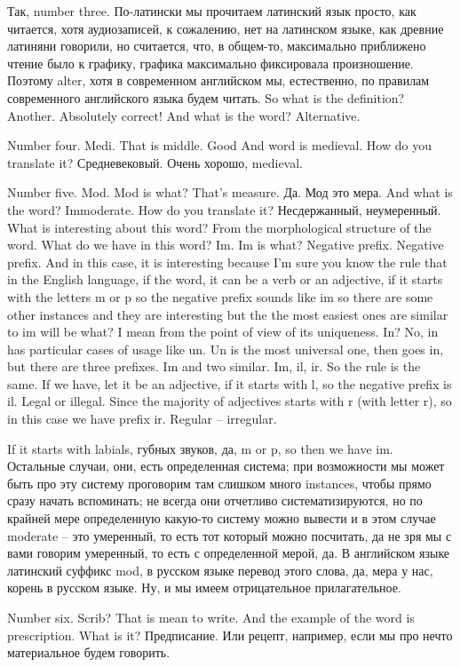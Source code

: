 \documentclass[main.tex]{subfiles}
\begin{document}
Так, number three.
По-латински мы прочитаем латинский язык просто, как читается, хотя аудиозаписей, к сожалению, нет на латинском языке, как древние латиняни говорили, но считается, что, в общем-то, максимально приближено чтение было к графику, графика максимально фиксировала произношение.
Поэтому alter, хотя в современном английском мы, естественно, по правилам современного английского языка будем читать.
So what is the definition? Another. Absolutely correct!
And what is the word? Alternative.

Number four.
Medi. That is middle. Good
And word is medieval.
How do you translate it? Средневековый.
Очень хорошо, medieval.

Number five.
Mod.
Mod is what?
That's measure.
Да.
Мод это мера.
And what is the word? Immoderate.
How do you translate it? Несдержанный, неумеренный.
What is interesting about this word?
From the morphological structure of the word.
What do we have in this word? Im.
Im is what? Negative prefix.
Negative prefix.
And in this case, it is interesting because I'm sure you know the rule that in the English language, if the word, it can be a verb or an adjective, if it starts with the letters m or p so the negative prefix sounds like im so there are some other instances and they are interesting but the the most easiest ones are similar to im will be what? I mean from the point of view of its uniqueness.
In? No, in has particular cases of usage like un.
Un is the most universal one, then goes in, but there are three prefixes.
Im and two similar.
Im, il, ir.
So the rule is the same.
If we have, let it be an adjective, if it starts with l, so the negative prefix is il.
Legal or illegal.
Since the majority of adjectives starts with r (with letter r), so in this case we have prefix ir.
Regular -- irregular.

If it starts with labials, губных звуков, да, m or p, so then we have im.
Остальные случаи, они, есть определенная система; при возможности мы может быть про эту систему проговорим там слишком много instances, чтобы прямо сразу начать вспоминать; не всегда они отчетливо систематизируются, но по крайней мере определенную какую-то систему можно вывести и в этом случае moderate -- это умеренный, то есть тот который можно посчитать, да не зря мы с вами говорим умеренный, то есть с определенной мерой, да.
В английском языке латинский суффикс mod, в русском языке перевод этого слова, да, мера у нас, корень в русском языке.
Ну, и мы имеем отрицательное прилагательное.

Number six. Scrib?
That is mean to write.
And the example of the word is prescription.
What is it? Предписание.
Или рецепт, например, если мы про нечто материальное будем говорить.
\end{document}
